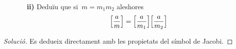 \documentclass[a4paper]{article}
\newenvironment{solution}{
    \renewcommand\qedsymbol{\ensuremath{\lozenge}}
    \begin{proof}[Solució]
        }{
    \end{proof}
}
\begin{document}
\begin{enumerate}
    \item[] \begin{enumerate}
        \item[\textbf{ii)}] Deduïu que si~\(m=m_{1}m_{2}\) aleshores
            \[
                \Bigl[\frac{a}{m}\Bigr]
                =
                \Bigl[\frac{a}{m_{1}}\Bigr]
                \Bigl[\frac{a}{m_{2}}\Bigr]
            \]
    \end{enumerate}
\end{enumerate}

\begin{solution}
    Es dedueix directament amb les propietats del símbol de Jacobi.
\end{solution}
\end{document}
